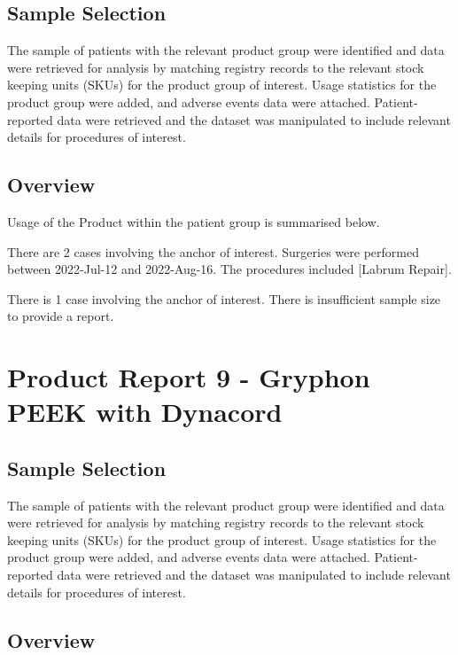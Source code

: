 \documentclass[
]{article}
\begin{document}
\subsection{Sample Selection}\label{sample-selection-7}

The sample of patients with the relevant product group were identified
and data were retrieved for analysis by matching registry records to the
relevant stock keeping units (SKUs) for the product group of interest.
Usage statistics for the product group were added, and adverse events
data were attached. Patient-reported data were retrieved and the dataset
was manipulated to include relevant details for procedures of interest.

\subsection{Overview}\label{overview-7}

Usage of the Product within the patient group is summarised below.

There are 2 cases involving the anchor of interest. Surgeries were
performed between 2022-Jul-12 and 2022-Aug-16. The procedures included
{[}Labrum Repair{]}.

There is 1 case involving the anchor of interest. There is insufficient
sample size to provide a report.

\section{Product Report 9 - Gryphon PEEK with
Dynacord}\label{product-report-9---gryphon-peek-with-dynacord}

\subsection{Sample Selection}\label{sample-selection-8}

The sample of patients with the relevant product group were identified
and data were retrieved for analysis by matching registry records to the
relevant stock keeping units (SKUs) for the product group of interest.
Usage statistics for the product group were added, and adverse events
data were attached. Patient-reported data were retrieved and the dataset
was manipulated to include relevant details for procedures of interest.

\subsection{Overview}\label{overview-8}
\end{document}
